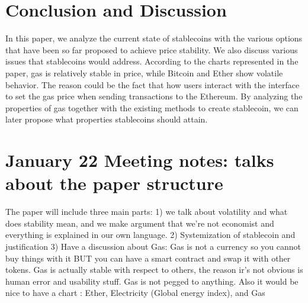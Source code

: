 \section{Conclusion and Discussion}
In this paper, we analyze the current state of stablecoins with the various options that have been so far proposed to achieve price stability. We also discuss various issues that stablecoins would address. According to the charts represented in the paper, gas is relatively stable in price, while Bitcoin and Ether show volatile behavior. The reason could be the fact that how users interact with the interface to set the gas price when sending transactions to the Ethereum. By analyzing the properties of gas together with the existing methods to create stablecoin, we can later propose what properties stablecoins should attain.

\section{January 22 Meeting notes: talks about the paper structure}

The paper will include three main parts: 
1) we talk about volatility and what does stability mean, and we make argument that we're not economist and everything is explained in our own language.
2) Systemization of stablecoin and justification
3) Have a discussion about Gas: Gas is not a currency so you cannot buy things with it BUT you can have a smart contract and swap it with other tokens.  Gas is actually stable with respect to others, the reason ir's not obvious is human error and usability stuff. Gas is not pegged to anything. Also it would be nice to have a chart : Ether, Electricity (Global energy index), and Gas





